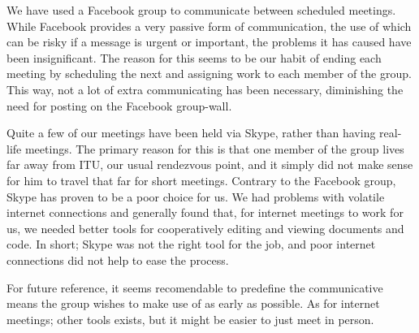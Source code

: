 We have used a Facebook group to communicate between scheduled meetings. While Facebook provides a very passive form of communication, the use of which can be risky if a message is urgent or important, the problems it has caused 
have been insignificant. The reason for this seems to be our habit of ending each meeting by scheduling the next and assigning work to each member of the group. This way, not a lot of extra communicating has been necessary, diminishing the need for posting on the Facebook group-wall.

Quite a few of our meetings have been held via Skype, rather than having real-life meetings. The primary reason for this is that one member of the group lives far away from ITU, our usual rendezvous point, and it simply did not make sense for him to travel that far for short meetings.
Contrary to the Facebook group, Skype has proven to be a poor choice for us. We had problems with volatile internet connections and generally found that, for internet meetings to work for us, we needed better tools for cooperatively editing and viewing documents and code. In short; Skype was not the right tool for the job, and poor internet connections did not help to ease the process.

For future reference, it seems recomendable to predefine the communicative means the group wishes to make use of as early as possible. As for internet meetings; other tools exists, but it might be easier to just meet in person.
